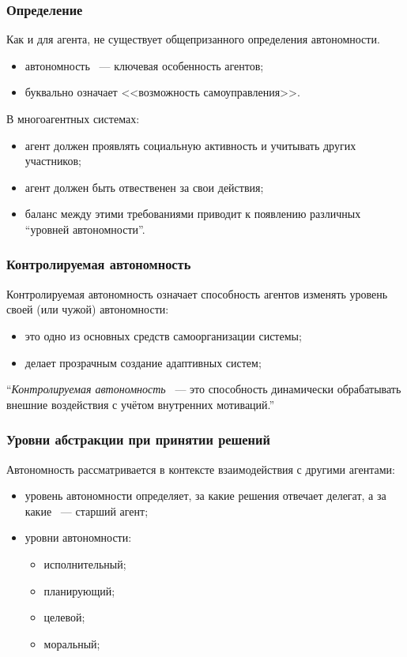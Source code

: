 \documentclass{beamer}
\begin{document}
\begin{frame}
  \frametitle{Определение}
  Как и для агента, не существует общепризанного определения автономности.
  \begin{itemize}
    \item автономность ~--- ключевая особенность агентов;
    \item буквально означает <<возможность самоуправления>>.
  \end{itemize}

  В многоагентных системах:
  \begin{itemize}
    \item агент должен проявлять социальную активность и учитывать других участников;
    \item агент должен быть отвественен за свои действия;
    \item баланс между этими требованиями приводит к появлению различных ``уровней автономности''.
  \end{itemize}
\end{frame}

\begin{frame}
  \frametitle{Контролируемая автономность}
  Контролируемая автономность означает способность агентов изменять
  уровень своей (или чужой) автономности:
  \begin{itemize}
    \item это одно из основных средств самоорганизации системы;
    \item делает прозрачным создание адаптивных систем;
  \end{itemize}

  \begin{exampleblock}{}
    {\large ``{\it Контролируемая автономность} ~--- это способность динамически
    обрабатывать внешние воздействия с учётом внутренних мотиваций.''}
    \vskip5mm
    \hspace*{}
  \end{exampleblock}
\end{frame}

\begin{frame}
  \frametitle{Уровни абстракции при принятии решений}
  Автономность рассматривается в контексте взаимодействия с другими агентами:
  \begin{itemize}
    \item уровень автономности определяет, за какие решения отвечает делегат, а за какие ~--- старший агент;
    \item уровни автономности:
      \begin{itemize}
        \item исполнительный;
        \item планирующий;
        \item целевой;
        \item моральный;
      \end{itemize}
  \end{itemize}
\end{frame}
\end{document}
